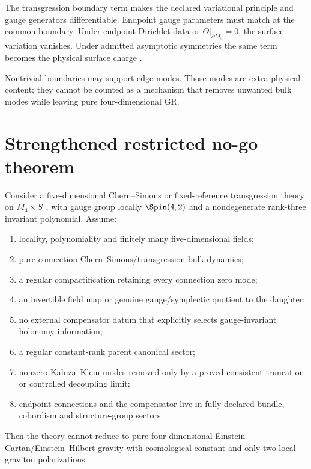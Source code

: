 The transgression boundary term makes the declared variational principle and gauge generators differentiable.  Endpoint gauge parameters must match at the common boundary.  Under endpoint Dirichlet data or $\Theta|_{\partial M_5}=0$, the surface variation vanishes.  Under admitted asymptotic symmetries the same term becomes the physical surface charge \citep{MoraOleaTroncosoZanelli2006,PaisSalgadoRebolledoVera2023}.

Nontrivial boundaries may support edge modes.  Those modes are extra physical content; they cannot be counted as a mechanism that removes unwanted bulk modes while leaving pure four-dimensional GR.

\section{Strengthened restricted no-go theorem}
\label{sec:nogo}

\begin{theorem}
Consider a five-dimensional Chern--Simons or fixed-reference transgression theory on $M_4\times S^1$, with gauge group locally $\Spin(4,2)$ and a nondegenerate rank-three invariant polynomial.  Assume:
\begin{enumerate}
\item locality, polynomiality and finitely many five-dimensional fields;
\item pure-connection Chern--Simons/transgression bulk dynamics;
\item a regular compactification retaining every connection zero mode;
\item an invertible field map or genuine gauge/symplectic quotient to the daughter;
\item no external compensator datum that explicitly selects gauge-invariant holonomy information;
\item a regular constant-rank parent canonical sector;
\item nonzero Kaluza--Klein modes removed only by a proved consistent truncation or controlled decoupling limit;
\item endpoint connections and the compensator live in fully declared bundle, cobordism and structure-group sectors.
\end{enumerate}
Then the theory cannot reduce to pure four-dimensional Einstein--Cartan/Einstein--Hilbert gravity with cosmological constant and only two local graviton polarizations.
\end{theorem}

